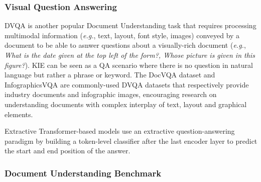 

\subsubsection{Visual Question Answering}


\ac{DVQA} is another popular Document Understanding task that requires processing multimodal information (\textit{e.g.}, text, layout, font style, images) conveyed by a document to be able to asnwer questions about a visually-rich document (\textit{e.g.}, \textit{What is the date given at the top left of the form?, Whose picture is given in this figure?}). \ac{KIE} can be seen as a \ac{QA} scenario where there is no question in natural language but rather a phrase or keyword. The DocVQA dataset \citep{mathew2021docvqa} and InfographicsVQA \citep{mathew2022infographicvqa} are commonly-used \ac{DVQA} datasets that respectively provide industry documents and infographic images, encouraging research on understanding documents with complex interplay of text, layout and graphical elements.

Extractive Transformer-based models use an extractive question-answering paradigm by building a token-level classifier after the last encoder layer to predict the start and end position of the answer.



\subsubsection{Document Understanding Benchmark}

